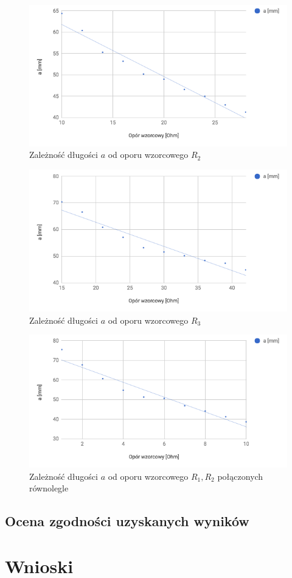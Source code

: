 \documentclass[a4paper,10pt,twoside]{article}
\begin{document}
\begin{figure}[!htp]
\centerline{\includegraphics[scale=0.5]{wykres_r2.png}}
\caption{Zależność długości $a$ od oporu wzorcowego $R_2$}
\label{fig:wykres_r2}
\end{figure}

\begin{figure}[!htp]
\centerline{\includegraphics[scale=0.5]{wykres_r3.png}}
\caption{Zależność długości $a$ od oporu wzorcowego $R_3$}
\label{fig:wykres_r3}
\end{figure}

\begin{figure}[!htp]
\centerline{\includegraphics[scale=0.5]{wykres_r1_r2_par.png}}
\caption{Zależność długości $a$ od oporu wzorcowego $R_1, R_2$ połączonych równolegle}
\label{fig:wykres_r1_r2_par}
\end{figure}

\subsection{Ocena zgodności uzyskanych wyników}

\section{Wnioski}
\end{document}
